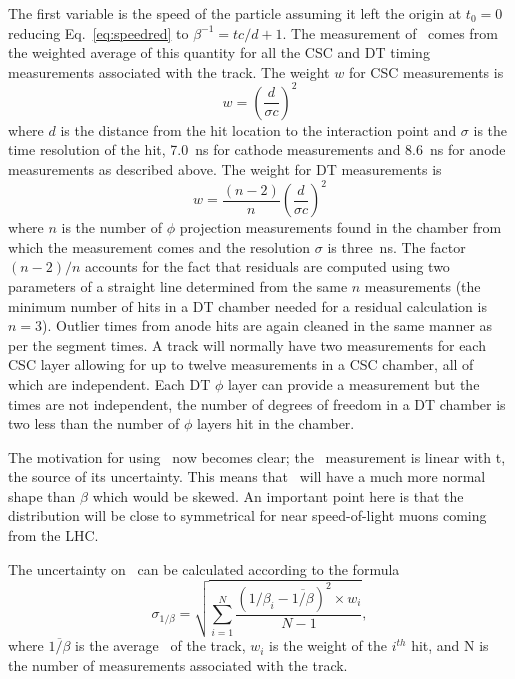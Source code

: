 The first variable is the speed of the particle assuming it left the origin at $t_0 = 0$ reducing Eq.~\ref{eq:speedred} to 
$\beta^{-1} = tc/d + 1$. The measurement of \invbeta\ comes from the weighted average of this quantity for all the
CSC and DT timing measurements associated with the track.
The weight $w$ for CSC measurements is
\begin{equation}
w = \left(\frac{d}{\sigma c}\right)^2
 \label{betaweight}
\end{equation}
where $d$ is the distance from the hit location to the interaction point
and $\sigma$ is the time resolution of the hit, 7.0~ns for cathode measurements and 8.6~ns for anode measurements as described above.
The weight for DT measurements is 
\begin{equation}
 w = \frac{(n-2)}{n}\left(\frac{d}{\sigma c}\right)^2
\end{equation}
where $n$ is the number of $\phi$ projection measurements found in the
chamber from which the measurement comes and the resolution $\sigma$ is three~ns.
The factor ${(n-2)/n}$ accounts for the fact that residuals are computed
using two parameters of a straight line determined from the same
$n$ measurements (the minimum number of hits in a DT chamber
needed for a residual calculation is $n=3$).
Outlier times from anode hits are again cleaned in the same manner as per the segment times. 
A track will normally have two measurements for each CSC layer allowing for up to twelve measurements in a CSC chamber, all of which are independent.
Each DT $\phi$ layer can provide a measurement but the times are not independent, the number of degrees of freedom in a DT chamber is two less than the number of $\phi$ layers
hit in the chamber.

The motivation for using \invbeta\ now becomes clear; the \invbeta\ measurement
is linear with t, the source of its uncertainty. This means that \invbeta\ will have a much more normal shape than $\beta$ which would be skewed.
An important point here is that the distribution will be close to symmetrical for near speed-of-light muons coming from the LHC.

The uncertainty on \invbeta\ can be calculated according to the formula
\begin{equation}
 \sigma_{1/\beta} = \sqrt{\sum_{i=1}^N \frac{(1/\beta_i - \overline{1/\beta})^2 \times w_{i}}{N-1}},
 \label{betaerr}
\end{equation}
where $\overline{1/\beta}$ is the average \invbeta\ of the track, $w_{i}$ is the weight of the $i^{th}$ hit, and N is the number of measurements associated with the track.

